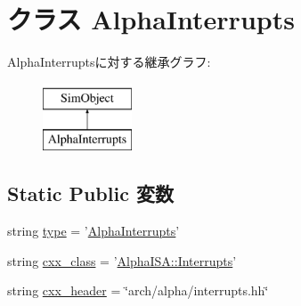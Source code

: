 \hypertarget{classAlphaInterrupts_1_1AlphaInterrupts}{
\section{クラス AlphaInterrupts}
\label{classAlphaInterrupts_1_1AlphaInterrupts}
}
AlphaInterruptsに対する継承グラフ:\begin{figure}[H]
\begin{center}
\leavevmode
\includegraphics[height=2cm]{classAlphaInterrupts_1_1AlphaInterrupts}
\end{center}
\end{figure}
\subsection*{Static Public 変数}
\begin{DoxyCompactItemize}
\item 
string \hyperlink{classAlphaInterrupts_1_1AlphaInterrupts_acce15679d830831b0bbe8ebc2a60b2ca}{type} = '\hyperlink{classAlphaInterrupts_1_1AlphaInterrupts}{AlphaInterrupts}'
\item 
string \hyperlink{classAlphaInterrupts_1_1AlphaInterrupts_a58cd55cd4023648e138237cfc0822ae3}{cxx\_\-class} = '\hyperlink{classAlphaISA_1_1Interrupts}{AlphaISA::Interrupts}'
\item 
string \hyperlink{classAlphaInterrupts_1_1AlphaInterrupts_a17da7064bc5c518791f0c891eff05fda}{cxx\_\-header} = \char`\"{}arch/alpha/interrupts.hh\char`\"{}
\end{DoxyCompactItemize}


